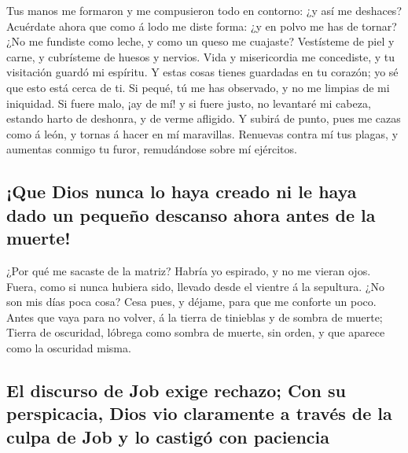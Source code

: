  Tus manos me formaron y me compusieron todo en contorno:
¿y así me deshaces?  Acuérdate ahora que como á lodo me
diste forma: ¿y en polvo me has de tornar?  ¿No me
fundiste como leche, y como un queso me cuajaste? 
Vestísteme de piel y carne, y cubrísteme de huesos y nervios.
 Vida y misericordia me concediste, y tu visitación
guardó mi espíritu.  Y estas cosas tienes guardadas en tu
corazón; yo sé que esto está cerca de ti.  Si pequé, tú
me has observado, y no me limpias de mi iniquidad.  Si
fuere malo, ¡ay de mí! y si fuere justo, no levantaré mi cabeza, estando
harto de deshonra, y de verme afligido.  Y subirá de
punto, pues me cazas como á león, y tornas á hacer en mí maravillas.
 Renuevas contra mí tus plagas, y aumentas conmigo tu
furor, remudándose sobre mí ejércitos.

\hypertarget{que-dios-nunca-lo-haya-creado-ni-le-haya-dado-un-pequeuxf1o-descanso-ahora-antes-de-la-muerte}{%
\subsection{¡Que Dios nunca lo haya creado ni le haya dado un pequeño
descanso ahora antes de la
muerte!}\label{que-dios-nunca-lo-haya-creado-ni-le-haya-dado-un-pequeuxf1o-descanso-ahora-antes-de-la-muerte}}

 ¿Por qué me sacaste de la matriz? Habría yo espirado, y
no me vieran ojos.  Fuera, como si nunca hubiera sido,
llevado desde el vientre á la sepultura.  ¿No son mis
días poca cosa? Cesa pues, y déjame, para que me conforte un poco.
 Antes que vaya para no volver, á la tierra de tinieblas
y de sombra de muerte;  Tierra de oscuridad, lóbrega como
sombra de muerte, sin orden, y que aparece como la oscuridad misma.

\hypertarget{el-discurso-de-job-exige-rechazo-con-su-perspicacia-dios-vio-claramente-a-travuxe9s-de-la-culpa-de-job-y-lo-castiguxf3-con-paciencia}{%
\subsection{El discurso de Job exige rechazo; Con su perspicacia, Dios
vio claramente a través de la culpa de Job y lo castigó con
paciencia}\label{el-discurso-de-job-exige-rechazo-con-su-perspicacia-dios-vio-claramente-a-travuxe9s-de-la-culpa-de-job-y-lo-castiguxf3-con-paciencia}}

